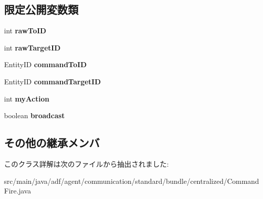 \subsection*{限定公開変数類}
\begin{DoxyCompactItemize}
\item 
\hypertarget{classadf_1_1agent_1_1communication_1_1standard_1_1bundle_1_1centralized_1_1CommandFire_a82bdd775417bd34a66cdd3ef2f4b6704}{}\label{classadf_1_1agent_1_1communication_1_1standard_1_1bundle_1_1centralized_1_1CommandFire_a82bdd775417bd34a66cdd3ef2f4b6704} 
int {\bfseries raw\+To\+ID}
\item 
\hypertarget{classadf_1_1agent_1_1communication_1_1standard_1_1bundle_1_1centralized_1_1CommandFire_a6f8e1ba3f4e07e275d5a8f1d613d1045}{}\label{classadf_1_1agent_1_1communication_1_1standard_1_1bundle_1_1centralized_1_1CommandFire_a6f8e1ba3f4e07e275d5a8f1d613d1045} 
int {\bfseries raw\+Target\+ID}
\item 
\hypertarget{classadf_1_1agent_1_1communication_1_1standard_1_1bundle_1_1centralized_1_1CommandFire_aaf4e5df81e6cb8aa3ea3b7ba48b3a251}{}\label{classadf_1_1agent_1_1communication_1_1standard_1_1bundle_1_1centralized_1_1CommandFire_aaf4e5df81e6cb8aa3ea3b7ba48b3a251} 
Entity\+ID {\bfseries command\+To\+ID}
\item 
\hypertarget{classadf_1_1agent_1_1communication_1_1standard_1_1bundle_1_1centralized_1_1CommandFire_ae5fce8493a2500b29c7187f495651097}{}\label{classadf_1_1agent_1_1communication_1_1standard_1_1bundle_1_1centralized_1_1CommandFire_ae5fce8493a2500b29c7187f495651097} 
Entity\+ID {\bfseries command\+Target\+ID}
\item 
\hypertarget{classadf_1_1agent_1_1communication_1_1standard_1_1bundle_1_1centralized_1_1CommandFire_a85cbeb2b045c7124c95a2233b67be181}{}\label{classadf_1_1agent_1_1communication_1_1standard_1_1bundle_1_1centralized_1_1CommandFire_a85cbeb2b045c7124c95a2233b67be181} 
int {\bfseries my\+Action}
\item 
\hypertarget{classadf_1_1agent_1_1communication_1_1standard_1_1bundle_1_1centralized_1_1CommandFire_a0bae03d4763b5725247eb7a1dd1a49b0}{}\label{classadf_1_1agent_1_1communication_1_1standard_1_1bundle_1_1centralized_1_1CommandFire_a0bae03d4763b5725247eb7a1dd1a49b0} 
boolean {\bfseries broadcast}
\end{DoxyCompactItemize}
\subsection*{その他の継承メンバ}


このクラス詳解は次のファイルから抽出されました\+:\begin{DoxyCompactItemize}
\item 
src/main/java/adf/agent/communication/standard/bundle/centralized/Command\+Fire.\+java\end{DoxyCompactItemize}
